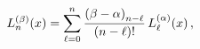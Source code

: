 \[\mathop{L^{(\beta)}_{n}\/}\nolimits\!\left(x\right)=\sum_{\ell=0}^{n}\frac{%
\left(\beta-\alpha\right)_{n-\ell}}{(n-\ell)!}\mathop{L^{(\alpha)}_{\ell}\/}%
\nolimits\!\left(x\right),\]